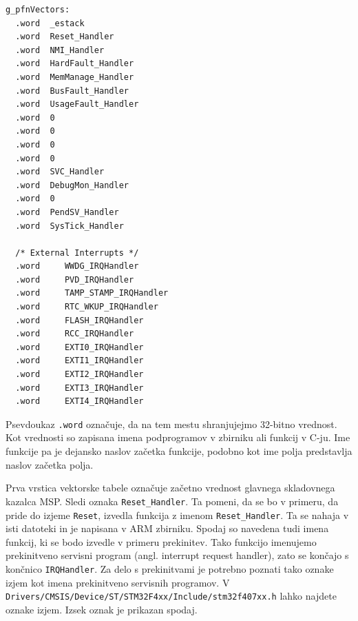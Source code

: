 \documentclass[12pt,letterpaper]{article}
\begin{document}
\begin{center}
\begin{lstlisting}[style=CStyle]
g_pfnVectors:
  .word  _estack
  .word  Reset_Handler
  .word  NMI_Handler
  .word  HardFault_Handler
  .word  MemManage_Handler
  .word  BusFault_Handler
  .word  UsageFault_Handler
  .word  0
  .word  0
  .word  0
  .word  0
  .word  SVC_Handler
  .word  DebugMon_Handler
  .word  0
  .word  PendSV_Handler
  .word  SysTick_Handler
  
  /* External Interrupts */
  .word     WWDG_IRQHandler                               
  .word     PVD_IRQHandler
  .word     TAMP_STAMP_IRQHandler
  .word     RTC_WKUP_IRQHandler
  .word     FLASH_IRQHandler            
  .word     RCC_IRQHandler                
  .word     EXTI0_IRQHandler
  .word     EXTI1_IRQHandler
  .word     EXTI2_IRQHandler
  .word     EXTI3_IRQHandler
  .word     EXTI4_IRQHandler
\end{lstlisting}
\end{center}
Psevdoukaz \texttt{.word} označuje, da na tem mestu shranjujejmo 32-bitno vrednost. Kot vrednosti so zapisana imena podprogramov v zbirniku ali funkcij v C-ju. Ime funkcije pa je dejansko naslov začetka funkcije, podobno kot ime polja predstavlja naslov začetka polja.

Prva vrstica vektorske tabele označuje začetno vrednost glavnega skladovnega kazalca MSP. Sledi oznaka \texttt{Reset\_Handler}. Ta pomeni, da se bo v primeru, da pride do izjeme \texttt{Reset}, izvedla funkcija z imenom \texttt{Reset\_Handler}. Ta se nahaja v isti datoteki in je napisana v ARM zbirniku. Spodaj so navedena tudi imena funkcij, ki se bodo izvedle v primeru prekinitev. Tako funkcijo imenujemo prekinitveno servisni program (angl. interrupt request handler), zato se končajo s končnico \texttt{IRQHandler}. Za delo s prekinitvami je potrebno poznati tako oznake izjem kot imena prekinitveno servisnih programov. V \texttt{Drivers/CMSIS/Device/ST/STM32F4xx/Include/stm32f407xx.h} lahko najdete oznake izjem. Izsek oznak je prikazan spodaj.
\end{document}
